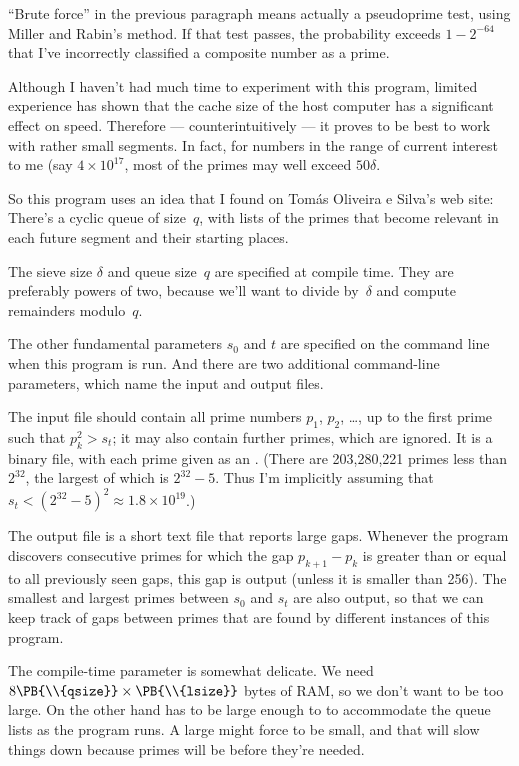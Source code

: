 ``Brute force'' in the previous paragraph means actually a pseudoprime test,
using Miller and Rabin's method.
If that test passes, the probability exceeds $1-2^{-64}$ that I've
incorrectly classified a composite number as a prime.

Although I haven't had much time to experiment with this program, limited
experience has shown that the cache size of the host computer has a
significant effect on speed. Therefore --- counterintuitively ---
it proves to be best to work with rather small segments. In fact,
for numbers in the range of current interest to me (say $4\times10^{17}$,
most of the primes may well exceed $50\delta$.

So this program uses an idea that I found on Tom\'as Oliveira e Silva's
web site: There's a cyclic queue of size~$q$, with lists of the primes that
become relevant in each future segment and their starting places.

\fi

The sieve size $\delta$ and queue size~$q$ are
specified at compile time.
They are preferably powers of two, because we'll want to divide
by~$\delta$ and compute remainders modulo~$q$.

The other fundamental parameters
$s_0$ and $t$ are specified on the command line when this program
is run. And there are two additional command-line parameters,
which name the input and output files.

The input file should contain
all prime numbers $p_1$, $p_2$, \dots, up to the first prime such
that $p_k^2>s_t$; it may also contain further primes, which are ignored.
It is a binary file, with each prime given as an .
(There are 203,280,221 primes less than $2^{32}$, the largest of which
is $2^{32}-5$. Thus I'm implicitly assuming that $s_t<(2^{32}-5)^2
\approx 1.8\times10^{19}$.)

The output file is a short text file that reports large gaps.
Whenever the program discovers consecutive primes for which the gap
$p_{k+1}-p_k$ is greater than or equal to all previously seen gaps,
this gap is output (unless it is smaller than 256).
The smallest and largest
primes between $s_0$ and $s_t$ are also output, so that we can keep
track of gaps between primes that are
found by different instances of this program.

The compile-time parameter  is somewhat delicate. We need
$8\PB{\\{qsize}}\times\PB{\\{lsize}}$ bytes of {\mc RAM}, so we don't want 
to be too large. On the other hand  has to be large enough to
to accommodate the queue lists as the program runs. A large 
might force  to be small, and that will slow things down because
primes will be before they're needed.

